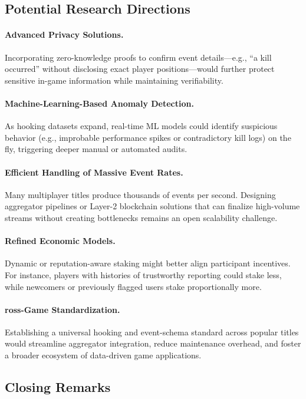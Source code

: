 \documentclass[11pt]{article}
\begin{document}
\subsection{Potential Research Directions}


\paragraph{Advanced Privacy Solutions.} Incorporating zero-knowledge proofs to confirm event details—e.g., “a kill occurred” without disclosing exact player positions—would further protect sensitive in-game information while maintaining verifiability.

\paragraph{Machine-Learning-Based Anomaly Detection.} As hooking datasets expand, real-time ML models could identify suspicious behavior (e.g., improbable performance spikes or contradictory kill logs) on the fly, triggering deeper manual or automated audits.

\paragraph{Efficient Handling of Massive Event Rates.} Many multiplayer titles produce thousands of events per second. Designing aggregator pipelines or Layer-2 blockchain solutions that can finalize high-volume streams without creating bottlenecks remains an open scalability challenge.


\paragraph{Refined Economic Models.} Dynamic or reputation-aware staking might better align participant incentives. For instance, players with histories of trustworthy reporting could stake less, while newcomers or previously flagged users stake proportionally more.

\paragraph{ross-Game Standardization.} Establishing a universal hooking and event-schema standard across popular titles would streamline aggregator integration, reduce maintenance overhead, and foster a broader ecosystem of data-driven game applications.

\subsection{Closing Remarks}
\end{document}
